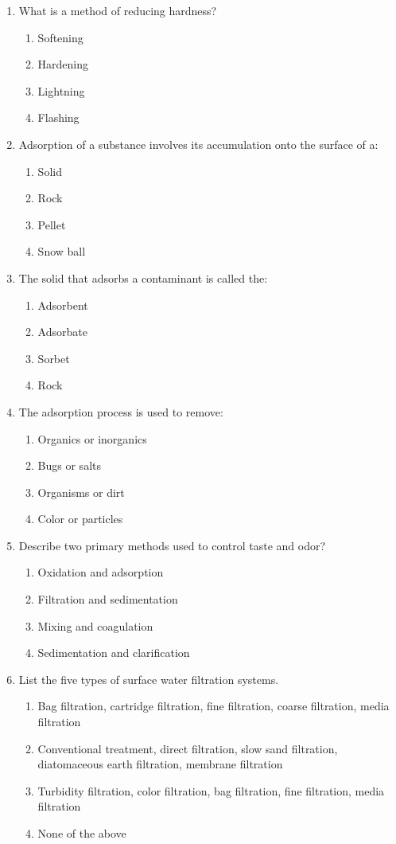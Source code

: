 \documentclass[10pt]{article}
\begin{document}
\begin{enumerate}
\begin{enumerate}
\item What is a method of reducing hardness?
\begin{enumerate}
\item Softening
\item Hardening
\item Lightning
\item Flashing
\end{enumerate}

\item Adsorption of a substance involves its accumulation onto the surface of a:
\begin{enumerate}
\item Solid
\item Rock
\item Pellet
\item Snow ball
\end{enumerate}

\item The solid that adsorbs a contaminant is called the:
\begin{enumerate}
\item Adsorbent
\item Adsorbate
\item Sorbet
\item Rock
\end{enumerate}

\item The adsorption process is used to remove:
\begin{enumerate}
\item Organics or inorganics
\item Bugs or salts
\item Organisms or dirt
\item Color or particles
\end{enumerate}

\item Describe two primary methods used to control taste and odor?
\begin{enumerate}
\item Oxidation and adsorption
\item Filtration and sedimentation
\item Mixing and coagulation
\item Sedimentation and clarification
\end{enumerate}



\item List the five types of surface water filtration systems.
\begin{enumerate}
\item Bag filtration, cartridge filtration, fine filtration, coarse filtration, media filtration
\item Conventional treatment, direct filtration, slow sand filtration, diatomaceous
earth filtration, membrane filtration
\item Turbidity filtration, color filtration, bag filtration, fine filtration, media filtration
\item None of the above
\end{enumerate}


\end{enumerate}
\end{enumerate}
\end{document}
